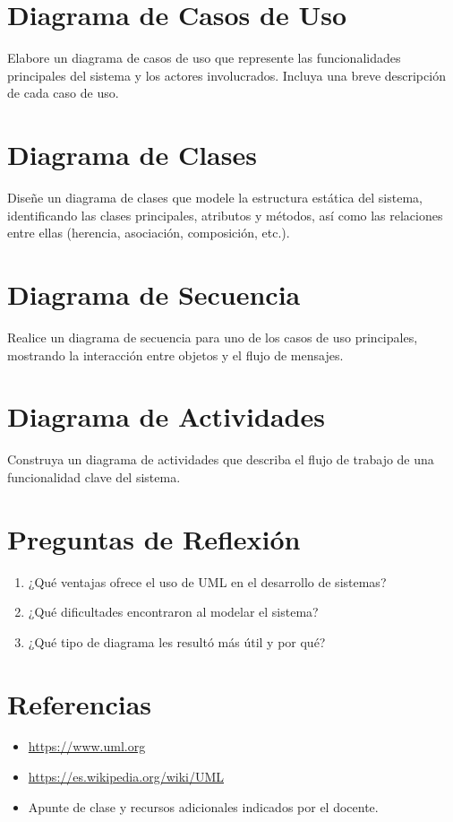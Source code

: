 \documentclass[12pt,a4paper]{article}
\begin{document}
\section{Diagrama de Casos de Uso}
Elabore un diagrama de casos de uso que represente las funcionalidades principales del sistema y los actores involucrados. Incluya una breve descripción de cada caso de uso.

\vspace{7cm}

\section{Diagrama de Clases}
Diseñe un diagrama de clases que modele la estructura estática del sistema, identificando las clases principales, atributos y métodos, así como las relaciones entre ellas (herencia, asociación, composición, etc.).

\vspace{8cm}

\section{Diagrama de Secuencia}
Realice un diagrama de secuencia para uno de los casos de uso principales, mostrando la interacción entre objetos y el flujo de mensajes.

\vspace{8cm}

\section{Diagrama de Actividades}
Construya un diagrama de actividades que describa el flujo de trabajo de una funcionalidad clave del sistema.

\vspace{8cm}

\section*{Preguntas de Reflexión}
\begin{enumerate}[label=\arabic*.]
    \item ¿Qué ventajas ofrece el uso de UML en el desarrollo de sistemas?
    \item ¿Qué dificultades encontraron al modelar el sistema?
    \item ¿Qué tipo de diagrama les resultó más útil y por qué?
\end{enumerate}

\vspace{2cm}

\section*{Referencias}
\begin{itemize}
    \item \url{https://www.uml.org}
    \item \url{https://es.wikipedia.org/wiki/UML}
    \item Apunte de clase y recursos adicionales indicados por el docente.
\end{itemize}
\end{document}
